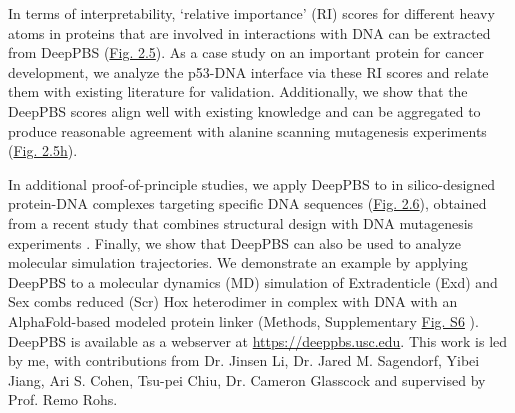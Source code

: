 \par
In terms of interpretability, ‘relative importance’ (RI) scores for different heavy atoms in proteins that are involved in interactions with DNA can be extracted from DeepPBS (\hyperref[fig:pdna4]{Fig. 2.5}). As a case study on an important protein for cancer development, we analyze the p53-DNA interface via these RI scores and relate them with existing literature for validation. Additionally, we show that the DeepPBS scores align well with existing knowledge and can be aggregated to produce reasonable agreement with alanine scanning mutagenesis experiments \citep{Morrison2001} (\hyperref[fig:pdna4]{Fig. 2.5h}).
\par
In additional proof-of-principle studies, we apply DeepPBS to in silico-designed protein-DNA complexes targeting specific DNA sequences (\hyperref[fig:pdna5]{Fig. 2.6}), obtained from a recent study that combines structural design with DNA mutagenesis experiments \citep{Glasscock2023}. Finally, we show that DeepPBS can also be used to analyze molecular simulation trajectories. We demonstrate an example by applying DeepPBS to a molecular dynamics (MD) simulation of Extradenticle (Exd) and Sex combs reduced (Scr) Hox heterodimer in complex with DNA \citep{Joshi2007} with an AlphaFold-based modeled protein linker (Methods, Supplementary \hyperref[fig:pdnaS5]{Fig. S6} ). DeepPBS is available as a webserver at \url{https://deeppbs.usc.edu}. This work is led by me, with contributions from Dr. Jinsen Li, Dr. Jared M. Sagendorf, Yibei Jiang, Ari S. Cohen, Tsu-pei Chiu, Dr. Cameron Glasscock and supervised by Prof. Remo Rohs.
\par
